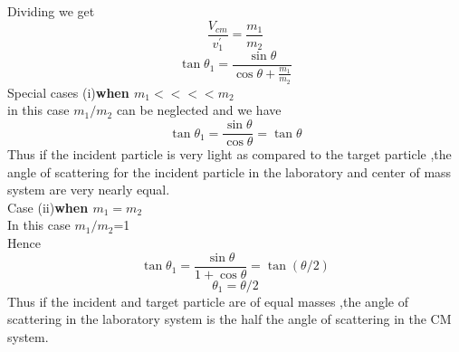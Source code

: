  Dividing we get $$\frac{V_{cm}}{v_1^{\prime}}=\frac{m_1}{m_2}$$
 $$\tan\theta_1=\frac{\sin\theta}{\cos\theta+\frac{m_1}{m_2}}$$
 Special cases (i)\textbf{when $m_1<<<<m_2$}\\
 in this case $m_1/m_2$ can be neglected and we have 
 $$\tan\theta_{1}=\frac{\sin \theta}{\cos\theta}=\tan\theta$$
 Thus if the incident particle is very light as compared to the target particle ,the angle of scattering for the incident particle in the laboratory and center of mass system are very nearly equal.\\
 Case (ii)\textbf{when $m_1=m_2$}\\
 In this case $m_1/m_2$=1\\
 Hence $$\tan\theta_{1}=\frac{\sin\theta}{1+\cos \theta}=\tan(\theta/2)$$
 $$\theta_{1}=\theta/2$$
 Thus if the incident and target particle are of equal masses ,the angle of scattering in the laboratory system is the half the angle of scattering in the CM system.
 
 
 
 
 
 
 
 
 
 
 
 
 
 
 
 
 
 
 
 
 
 
 
 
 
 
 
 
 
